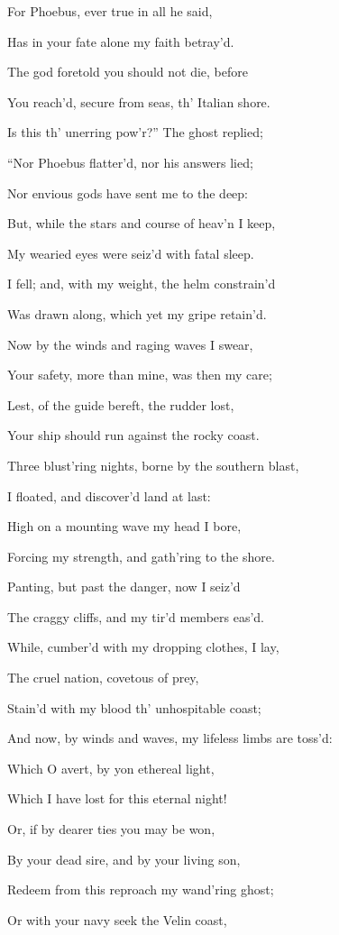 For Phoebus, ever true in all he said,

Has in your fate alone my faith betray’d.

The god foretold you should not die, before

You reach’d, secure from seas, th’ Italian shore.

Is this th’ unerring pow’r?” The ghost replied;

“Nor Phoebus flatter’d, nor his answers lied;

Nor envious gods have sent me to the deep:

But, while the stars and course of heav’n I keep,

My wearied eyes were seiz’d with fatal sleep.

I fell; and, with my weight, the helm constrain’d

Was drawn along, which yet my gripe retain’d.

Now by the winds and raging waves I swear,

Your safety, more than mine, was then my care;

Lest, of the guide bereft, the rudder lost,

Your ship should run against the rocky coast.

Three blust’ring nights, borne by the southern blast,

I floated, and discover’d land at last:

High on a mounting wave my head I bore,

Forcing my strength, and gath’ring to the shore.

Panting, but past the danger, now I seiz’d

The craggy cliffs, and my tir’d members eas’d.

While, cumber’d with my dropping clothes, I lay,

The cruel nation, covetous of prey,

Stain’d with my blood th’ unhospitable coast;

And now, by winds and waves, my lifeless limbs are toss’d:

Which O avert, by yon ethereal light,

Which I have lost for this eternal night!

Or, if by dearer ties you may be won,

By your dead sire, and by your living son,

Redeem from this reproach my wand’ring ghost;

Or with your navy seek the Velin coast,

